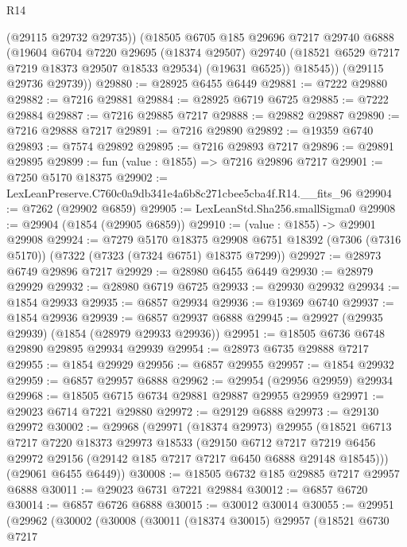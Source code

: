 \begin{lexlean}{R14}
\begin{coremodule}
          (@29115 @29732 @29735))
        (@18505
          @6705
          @185
          @29696
          @7217
          @29740
          @6888
          (@19604
            @6704
            @7220
            @29695
            (@18374 @29507)
            @29740
            (@18521 @6529 @7217 @7219 @18373 @29507 @18533 @29534)
            (@19631 @6525))
          @18545))
      (@29115 @29736 @29739))
@29880 := @28925 @6455 @6449
@29881 := @7222 @29880
@29882 := @7216 @29881
@29884 := @28925 @6719 @6725
@29885 := @7222 @29884
@29887 := @7216 @29885 @7217
@29888 := @29882 @29887
@29890 := @7216 @29888 @7217
@29891 := @7216 @29890
@29892 := @19359 @6740
@29893 := @7574 @29892
@29895 := @7216 @29893 @7217
@29896 := @29891 @29895
@29899 := fun (value : @1855) => @7216 @29896 @7217
@29901 := @7250 @5170 @18375
@29902 := LexLeanPreserve.C760c0a9db341e4a6b8c271cbee5cba4f.R14.__fits_96
@29904 := @7262 (@29902 @6859)
@29905 := LexLeanStd.Sha256.smallSigma0
@29908 := @29904 (@1854 (@29905 @6859))
@29910 := (value : @1855) -> @29901 @29908
@29924 := @7279
    @5170
    @18375
    @29908
    @6751
    @18392
    (@7306 (@7316 @5170))
    (@7322 (@7323 (@7324 @6751) @18375 @7299))
@29927 := @28973 @6749 @29896 @7217
@29929 := @28980 @6455 @6449
@29930 := @28979 @29929
@29932 := @28980 @6719 @6725
@29933 := @29930 @29932
@29934 := @1854 @29933
@29935 := @6857 @29934
@29936 := @19369 @6740
@29937 := @1854 @29936
@29939 := @6857 @29937 @6888
@29945 := @29927 (@29935 @29939) (@1854 (@28979 @29933 @29936))
@29951 := @18505 @6736 @6748 @29890 @29895 @29934 @29939
@29954 := @28973 @6735 @29888 @7217
@29955 := @1854 @29929
@29956 := @6857 @29955
@29957 := @1854 @29932
@29959 := @6857 @29957 @6888
@29962 := @29954 (@29956 @29959) @29934
@29968 := @18505 @6715 @6734 @29881 @29887 @29955 @29959
@29971 := @29023 @6714 @7221 @29880
@29972 := @29129 @6888
@29973 := @29130 @29972
@30002 := @29968
    (@29971
      (@18374 @29973)
      @29955
      (@18521
        @6713
        @7217
        @7220
        @18373
        @29973
        @18533
        (@29150
          @6712
          @7217
          @7219
          @6456
          @29972
          @29156
          (@29142 @185 @7217 @7217 @6450 @6888 @29148 @18545)))
      (@29061 @6455 @6449))
@30008 := @18505 @6732 @185 @29885 @7217 @29957 @6888
@30011 := @29023 @6731 @7221 @29884
@30012 := @6857 @6720
@30014 := @6857 @6726 @6888
@30015 := @30012 @30014
@30055 := @29951
    (@29962
      (@30002
        (@30008
          (@30011
            (@18374 @30015)
            @29957
            (@18521
              @6730
              @7217

\end{coremodule}
\end{lexlean}
